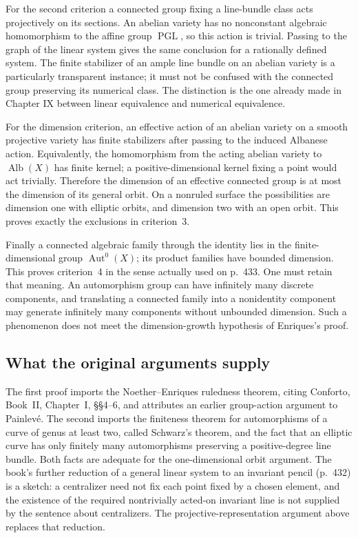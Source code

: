 For the second criterion a connected group fixing a line-bundle class acts projectively on its sections. An abelian variety has no nonconstant algebraic homomorphism to the affine group \(\operatorname{PGL}\), so this action is trivial. Passing to the graph of the linear system gives the same conclusion for a rationally defined system. The finite stabilizer of an ample line bundle on an abelian variety is a particularly transparent instance; it must not be confused with the connected group preserving its numerical class. The distinction is the one already made in Chapter IX between linear equivalence and numerical equivalence.

For the dimension criterion, an effective action of an abelian variety on a smooth projective variety has finite stabilizers after passing to the induced Albanese action. Equivalently, the homomorphism from the acting abelian variety to \(\operatorname{Alb}(X)\) has finite kernel; a positive-dimensional kernel fixing a point would act trivially. Therefore the dimension of an effective connected group is at most the dimension of its general orbit. On a nonruled surface the possibilities are dimension one with elliptic orbits, and dimension two with an open orbit. This proves exactly the exclusions in criterion~3.

Finally a connected algebraic family through the identity lies in the finite-dimensional group \(\operatorname{Aut}^0(X)\); its product families have bounded dimension. This proves criterion~4 in the sense actually used on p.~433. One must retain that meaning. An automorphism group can have infinitely many discrete components, and translating a connected family into a nonidentity component may generate infinitely many components without unbounded dimension. Such a phenomenon does not meet the dimension-growth hypothesis of Enriques's proof.

\subsection{What the original arguments supply}

The first proof imports the Noether--Enriques ruledness theorem, citing Conforto, Book~II, Chapter~I, \S\S4--6, and attributes an earlier group-action argument to Painlev\'e. The second imports the finiteness theorem for automorphisms of a curve of genus at least two, called Schwarz's theorem, and the fact that an elliptic curve has only finitely many automorphisms preserving a positive-degree line bundle. Both facts are adequate for the one-dimensional orbit argument. The book's further reduction of a general linear system to an invariant pencil (p.~432) is a sketch: a centralizer need not fix each point fixed by a chosen element, and the existence of the required nontrivially acted-on invariant line is not supplied by the sentence about centralizers. The projective-representation argument above replaces that reduction.

